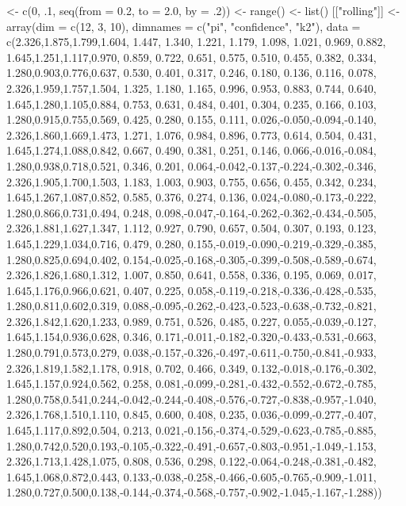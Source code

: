 \documentclass[10pt]{article}%
\begin{document}
\nwenddocs{}\endmoddef\nwstartdeflinemarkup\nwenddeflinemarkup
{} <- c(0, .1, seq(from = 0.2, to = 2.0, by = .2))
 <- range()
 <- list()
[["rolling"]] <- array(dim = c(12, 3, 10), dimnames = c("pi", "confidence", "k2"), 
  data = 
  c(2.326,1.875,1.799,1.604, 1.447, 1.340, 1.221, 1.179, 1.098, 1.021, 0.969, 0.882,
    1.645,1.251,1.117,0.970, 0.859, 0.722, 0.651, 0.575, 0.510, 0.455, 0.382, 0.334,
    1.280,0.903,0.776,0.637, 0.530, 0.401, 0.317, 0.246, 0.180, 0.136, 0.116, 0.078,
    2.326,1.959,1.757,1.504, 1.325, 1.180, 1.165, 0.996, 0.953, 0.883, 0.744, 0.640,
    1.645,1.280,1.105,0.884, 0.753, 0.631, 0.484, 0.401, 0.304, 0.235, 0.166, 0.103,
    1.280,0.915,0.755,0.569, 0.425, 0.280, 0.155, 0.111, 0.026,-0.050,-0.094,-0.140,
    2.326,1.860,1.669,1.473, 1.271, 1.076, 0.984, 0.896, 0.773, 0.614, 0.504, 0.431,
    1.645,1.274,1.088,0.842, 0.667, 0.490, 0.381, 0.251, 0.146, 0.066,-0.016,-0.084,
    1.280,0.938,0.718,0.521, 0.346, 0.201, 0.064,-0.042,-0.137,-0.224,-0.302,-0.346,
    2.326,1.905,1.700,1.503, 1.183, 1.003, 0.903, 0.755, 0.656, 0.455, 0.342, 0.234,
    1.645,1.267,1.087,0.852, 0.585, 0.376, 0.274, 0.136, 0.024,-0.080,-0.173,-0.222,
    1.280,0.866,0.731,0.494, 0.248, 0.098,-0.047,-0.164,-0.262,-0.362,-0.434,-0.505,
    2.326,1.881,1.627,1.347, 1.112, 0.927, 0.790, 0.657, 0.504, 0.307, 0.193, 0.123,
    1.645,1.229,1.034,0.716, 0.479, 0.280, 0.155,-0.019,-0.090,-0.219,-0.329,-0.385,
    1.280,0.825,0.694,0.402, 0.154,-0.025,-0.168,-0.305,-0.399,-0.508,-0.589,-0.674,
    2.326,1.826,1.680,1.312, 1.007, 0.850, 0.641, 0.558, 0.336, 0.195, 0.069, 0.017,
    1.645,1.176,0.966,0.621, 0.407, 0.225, 0.058,-0.119,-0.218,-0.336,-0.428,-0.535,
    1.280,0.811,0.602,0.319, 0.088,-0.095,-0.262,-0.423,-0.523,-0.638,-0.732,-0.821,
    2.326,1.842,1.620,1.233, 0.989, 0.751, 0.526, 0.485, 0.227, 0.055,-0.039,-0.127,
    1.645,1.154,0.936,0.628, 0.346, 0.171,-0.011,-0.182,-0.320,-0.433,-0.531,-0.663,
    1.280,0.791,0.573,0.279, 0.038,-0.157,-0.326,-0.497,-0.611,-0.750,-0.841,-0.933,
    2.326,1.819,1.582,1.178, 0.918, 0.702, 0.466, 0.349, 0.132,-0.018,-0.176,-0.302,
    1.645,1.157,0.924,0.562, 0.258, 0.081,-0.099,-0.281,-0.432,-0.552,-0.672,-0.785,
    1.280,0.758,0.541,0.244,-0.042,-0.244,-0.408,-0.576,-0.727,-0.838,-0.957,-1.040,
    2.326,1.768,1.510,1.110, 0.845, 0.600, 0.408, 0.235, 0.036,-0.099,-0.277,-0.407,
    1.645,1.117,0.892,0.504, 0.213, 0.021,-0.156,-0.374,-0.529,-0.623,-0.785,-0.885,
    1.280,0.742,0.520,0.193,-0.105,-0.322,-0.491,-0.657,-0.803,-0.951,-1.049,-1.153,
    2.326,1.713,1.428,1.075, 0.808, 0.536, 0.298, 0.122,-0.064,-0.248,-0.381,-0.482,
    1.645,1.068,0.872,0.443, 0.133,-0.038,-0.258,-0.466,-0.605,-0.765,-0.909,-1.011,
    1.280,0.727,0.500,0.138,-0.144,-0.374,-0.568,-0.757,-0.902,-1.045,-1.167,-1.288))
\end{document}
